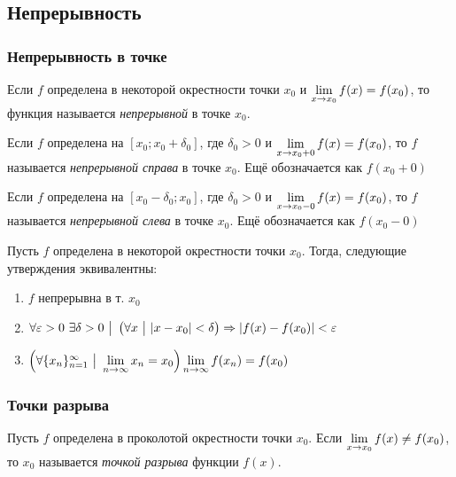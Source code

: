 \subsection{Непрерывность}

\subsubsection*{Непрерывность в точке}

\begin{definition}
	Если $f$ определена в некоторой окрестности точки $x_0$ и $\lim\limits_{x \to x_0} f(x) = f(x_0)$, то функция называется \textit{непрерывной} в точке $x_0$.
\end{definition}

\begin{definition}
	Если $f$ определена на $[x_0; x_0 + \delta_0]$, где $\delta_0 > 0$ и $\lim\limits_{x \to x_0 + 0} f(x) = f(x_0)$, то $f$ называется \textit{непрерывной справа} в точке $x_0$. Ещё обозначается как $f(x_0 + 0)$
\end{definition}

\begin{definition}
	Если $f$ определена на $[x_0 - \delta_0; x_0]$, где $\delta_0 > 0$ и $\lim\limits_{x \to x_0 - 0} f(x) = f(x_0)$, то $f$ называется \textit{непрерывной слева} в точке $x_0$. Ещё обозначается как $f(x_0 - 0)$
\end{definition}

\begin{theorem}
	Пусть $f$ определена в некоторой окрестности точки $x_0$. Тогда, следующие утверждения эквивалентны:
	\begin{enumerate}
		\item $f$ непрерывна в т. $x_0$
		\item $\forall \varepsilon > 0\ \exists \delta > 0 \ \big|\  \left(\forall x \ \big|\  |x - x_0| < \delta\right) \Rightarrow |f(x) - f(x_0)| < \varepsilon$
		\item $\left(\forall \{x_n\}_{n = 1}^\infty \ \big|\  \lim\limits_{n \to \infty} x_n = x_0\right) \lim\limits_{n \to \infty} f(x_n) = f(x_0)$
	\end{enumerate}
\end{theorem}

\subsubsection*{Точки разрыва}

\begin{definition}
	Пусть $f$ определена в проколотой окрестности точки $x_0$. Если $\lim\limits_{x \to x_0} f(x) \neq f(x_0)$, то $x_0$ называется \textit{точкой разрыва} функции $f(x)$.
\end{definition}

